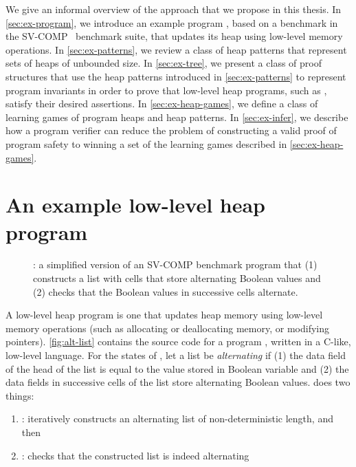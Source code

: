 \label{ch:overview}
We give an informal overview of the approach that we
propose in this thesis.
%
In \autoref{sec:ex-program}, we introduce an example program \altlist,
based on a benchmark in the SV-COMP~\cite{sv-comp} benchmark suite,
that updates its heap using low-level memory operations.
%
In \autoref{sec:ex-patterns}, we review a class of heap patterns that
represent sets of heaps of unbounded size.
%
In \autoref{sec:ex-tree}, we present a class of proof structures that
use the heap patterns introduced in \autoref{sec:ex-patterns} to
represent program invariants in order to prove that low-level heap
programs, such as \altlist, satisfy their desired assertions.
%
In \autoref{sec:ex-heap-games}, we define a class of learning games of
program heaps and heap patterns.
%
In \autoref{sec:ex-infer}, we describe how a program verifier can
reduce the problem of constructing a valid proof of program safety to
winning a set of the learning games described in
\autoref{sec:ex-heap-games}.

\section{An example low-level heap program}
\label{sec:ex-program}
\begin{figure}
  \centering
  
  \caption{\altlist: a simplified version of an SV-COMP benchmark program that
    (1) constructs a list with cells that store alternating Boolean values
    and
    (2) checks that the Boolean values in successive cells alternate.
  }
  \label{fig:alt-list}
\end{figure}
A low-level heap program is one that updates heap memory using low-level memory operations (such as allocating or deallocating memory, or modifying pointers). \autoref{fig:alt-list} contains the source code for a program \altlist, written in a C-like, low-level language.
%
For the states of \altlist, let a list be \emph{alternating} if (1) the data field of the head of the list is equal to the value stored in Boolean variable \datavarnm and (2) the data fields in successive cells of the list store alternating Boolean values.
%
\altlist does two things:
\begin{enumerate}
  \item \consloop: iteratively constructs an alternating list of non-deterministic length, and then
  \item \chkloop: checks that the constructed list is indeed alternating
\end{enumerate}

